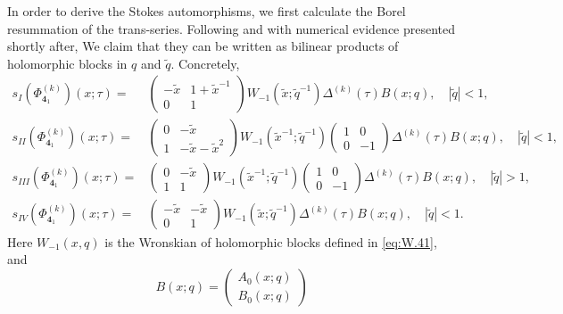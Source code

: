 \documentclass[a4paper,11pt]{article}	%
\def\md{\mathbf}
\def\tq{\tilde{q}}
\def\tx{\tilde{x}}
\newcommand{\knot}[1]{\md{#1}}
\begin{document}
In order to derive the Stokes automorphisms, we first calculate the
Borel resummation of the trans-series.  Following
\cite{Garoufalidis:2020xec} and with numerical evidence presented
shortly after, We claim that they can be written as bilinear products
of holomorphic blocks in $q$ and $\tq$. Concretely,
\begin{subequations}
\begin{align}
  s_{I}(\Phi^{(k)}_{\knot{4}_1})(x;\tau) =
  &\begin{pmatrix}
    -\tx & 1 + \tx^{-1}\\
    0&1
  \end{pmatrix}W_{-1}(\tx;\tq^{-1})
       \Delta^{(k)}(\tau) B(x;q),\quad |\tq|<1,
       \label{eq:s1.41}\\
  s_{II}(\Phi^{(k)}_{\knot{4}_1})(x;\tau) =
  &\begin{pmatrix}
    0 & -\tx \\ 1 & -\tx - \tx^2
  \end{pmatrix}W_{-1}(\tx^{-1};\tq^{-1})
                    \begin{pmatrix}
                      1&0\\0&-1
                    \end{pmatrix}\Delta^{(k)}(\tau) B(x;q),\quad |\tq|<1,
                              \label{eq:s2.41}\\
  s_{III}(\Phi^{(k)}_{\knot{4}_1})(x;\tau) =
  &\begin{pmatrix}
    0&-\tx\\1&1
  \end{pmatrix} W_{-1}(\tx^{-1};\tq^{-1})
               \begin{pmatrix}
                 1&0\\0&-1
               \end{pmatrix}\Delta^{(k)}(\tau)B(x;q),\quad |\tq|>1,
  \label{eq:s3.41}\\
  s_{IV}(\Phi^{(k)}_{\knot{4}_1})(x;\tau) =
  &\begin{pmatrix}
    -\tx&-\tx\\0&1
  \end{pmatrix} W_{-1}(\tx;\tq^{-1})\Delta^{(k)}(\tau)B(x;q),\quad |\tq|<1.
                  \label{eq:s4.41}
\end{align}
\end{subequations}
Here $W_{-1}(x,q)$ is the Wronskian of holomorphic blocks defined in
\eqref{eq:W.41}, and
\begin{equation}
  B(x;q) =
  \begin{pmatrix}
    A_0(x;q)\\
    B_0(x;q)
  \end{pmatrix}
\end{equation}
\end{document}
